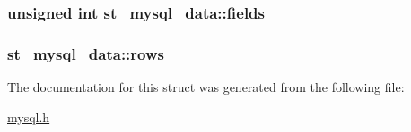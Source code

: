 \subsubsection[{fields}]{\setlength{\rightskip}{0pt plus 5cm}unsigned int st\+\_\+mysql\+\_\+data\+::fields}\label{structst__mysql__data_a2f8ebd2f46566f6476d3588b7e6ea25c}
\hypertarget{structst__mysql__data_ad22f63e6158c6b6e408fdcb255fdbe3d}{}
\subsubsection[{rows}]{ st\+\_\+mysql\+\_\+data\+::rows}\label{structst__mysql__data_ad22f63e6158c6b6e408fdcb255fdbe3d}


The documentation for this struct was generated from the following file\+:\begin{DoxyCompactItemize}
\item 
\hyperlink{mysql_8h}{mysql.\+h}\end{DoxyCompactItemize}

